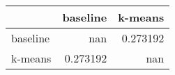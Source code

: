 \begin{tabular}{lrr}
\toprule
          &   baseline &    k-means \\
\midrule
 baseline & nan        &   0.273192 \\
 k-means  &   0.273192 & nan        \\
\bottomrule
\end{tabular}